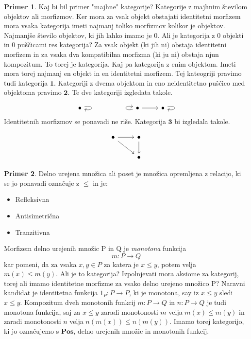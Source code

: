 \documentclass[12pt,a4paper]{book}
\theoremstyle{definition}
\theoremstyle{plain}
\theoremstyle{definition}
\newtheorem{primer}{Primer}[section]
\theoremstyle{remark}
\newcommand{\cat}[1]{\textbf{#1}}
\begin{document}
\begin{primer}
Kaj bi bil primer "majhne" kategorije? Kategorije z majhnim številom objektov ali morfizmov. Ker mora za vsak objekt obstajati identitetni morfizem mora vsaka kategorija imeti najmanj toliko morfizmov kolikor je objektov. Najmanjše število objektov, ki jih lahko imamo je 0. Ali je kategorija z 0 objekti in 0 puščicami res kategorija? Za vsak objekt (ki jih ni) obstaja identitetni morfizem in za vsaka dva kompatibilna morfizma (ki ju ni) obstaja njun kompozitum. To torej je kategorija. Kaj pa kategorija z enim objektom. Imeti mora torej najmanj en objekt in en identitetni morfizem. Tej kateogriji pravimo tudi kategorija $\mathbf{1}$. Kategoriji z dvema objektom in eno neidentitetno puščico med objektoma pravimo $\mathbf{2}$. Te dve kategoriji izgledata takole.

\begin{equation}
\begin{tikzcd}
\bullet \arrow[loop right] &&&  \arrow[loop left] \bullet \arrow[r] & \bullet \arrow[loop right]
\end{tikzcd}
\end{equation}
Identitetnih morfizmov se ponavadi ne riše. Kategorija $\cat{3}$ bi izgledala takole.

\begin{equation}
\begin{tikzcd}
\bullet \arrow[r] \arrow[rd] & \bullet \arrow[d] \\
& \bullet
\end{tikzcd}
\end{equation}

\end{primer}


\begin{primer}
Delno urejena množica ali poset je množica opremljena z relacijo, ki se jo ponavadi označuje z $\leq$ in je:
\begin{itemize}
\item Refleksivna
\item Antisimetrična
\item Tranzitivna
\end{itemize}
Morfizem delno urejenih množic P in Q je \textit{monotona} funkcija
$$m : P \to Q$$
kar pomeni, da za vsaka $x,y \in P$ za katera je $x \leq y$, potem velja $m(x) \leq m(y)$. Ali je to kategorija? Izpolnjevati mora aksiome za kategorij, torej ali imamo identitetne morfizme za vsako delno urejeno množico P? Naravni kandidat je identitetna funkcija $1_P : P \to P$, ki je monotona, say iz $x \leq y$ sledi $x \leq y$.
Kompozitum dveh monotonih funkcij $m : P \to Q$ in $n : P \to Q$ je tudi monotona funkcija, saj za $x \leq y$ zaradi monotonosti $m$ velja $m(x) \leq m(y)$ in zaradi monotonosti $n$ velja $n(m(x)) \leq n(m(y))$. Imamo torej kategorijo, ki jo označujemo s $\cat{Pos}$, delno urejenih množic in monotonih funkcij.
\end{primer}
\end{document}
